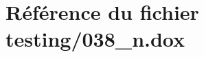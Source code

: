 \hypertarget{038__n_8dox}{}\section{Référence du fichier testing/038\+\_\+n.dox}
\label{038__n_8dox}
